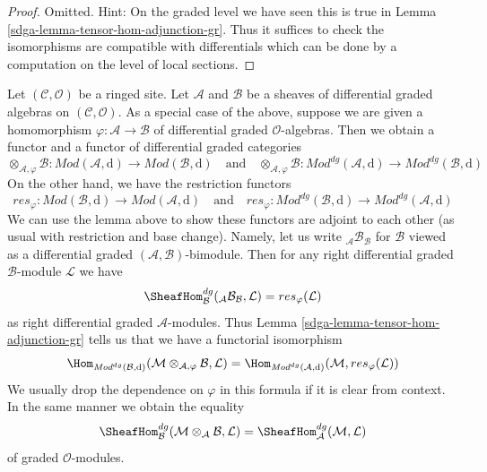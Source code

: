 \begin{proof}

Omitted. Hint: On the graded level we have seen this is true in
Lemma \ref{sdga-lemma-tensor-hom-adjunction-gr}. Thus it suffices
to check the isomorphisms are compatible with differentials
which can be done by a computation on the level of local sections.
\end{proof}

Let $(\mathcal{C}, \mathcal{O})$ be a ringed site. Let $\mathcal{A}$
and $\mathcal{B}$ be a sheaves of differential graded algebras on
$(\mathcal{C}, \mathcal{O})$.
As a special case of the above, suppose we are given
a homomorphism $\varphi : \mathcal{A} \to \mathcal{B}$
of differential graded $\mathcal{O}$-algebras. Then we obtain a functor
and a functor of differential graded categories
$$
\otimes_{\mathcal{A}, \varphi} \mathcal{B} :
\textit{Mod}(\mathcal{A}, \text{d})
\longrightarrow
\textit{Mod}(\mathcal{B}, \text{d})
\quad\text{and}\quad
\otimes_{\mathcal{A}, \varphi} \mathcal{B} :
\textit{Mod}^{dg}(\mathcal{A}, \text{d})
\longrightarrow
\textit{Mod}^{dg}(\mathcal{B}, \text{d})
$$
On the other hand, we have the restriction functors
$$
res_\varphi :
\textit{Mod}(\mathcal{B}, \text{d})
\longrightarrow
\textit{Mod}(\mathcal{A}, \text{d})
\quad\text{and}\quad
res_\varphi :
\textit{Mod}^{dg}(\mathcal{B}, \text{d})
\longrightarrow
\textit{Mod}^{dg}(\mathcal{A}, \text{d})
$$
We can use the lemma above to show these functors are adjoint to
each other (as usual with restriction and base change). Namely,
let us write ${}_\mathcal{A}\mathcal{B}_\mathcal{B}$ for
$\mathcal{B}$ viewed as a differential graded
$(\mathcal{A}, \mathcal{B})$-bimodule.
Then for any right differential graded $\mathcal{B}$-module $\mathcal{L}$
we have
$$
\SheafHom_\mathcal{B}^{dg}({}_\mathcal{A}\mathcal{B}_\mathcal{B}, \mathcal{L})
= res_\varphi(\mathcal{L})
$$
as right differential graded $\mathcal{A}$-modules. Thus
Lemma \ref{sdga-lemma-tensor-hom-adjunction-gr}
tells us that we have a functorial isomorphism
$$
\Hom_{\textit{Mod}^{dg}(\mathcal{B}, \text{d})}(
\mathcal{M} \otimes_{\mathcal{A}, \varphi} \mathcal{B}, \mathcal{L}) =
\Hom_{\textit{Mod}^{dg}(\mathcal{A}, \text{d})}(
\mathcal{M}, res_\varphi(\mathcal{L}))
$$
We usually drop the dependence on $\varphi$ in this formula if it
is clear from context. In the same manner we obtain
the equality
$$
\SheafHom^{dg}_\mathcal{B}(
\mathcal{M} \otimes_\mathcal{A} \mathcal{B}, \mathcal{L}) =
\SheafHom_\mathcal{A}^{dg}(\mathcal{M}, \mathcal{L})
$$
of graded $\mathcal{O}$-modules.

